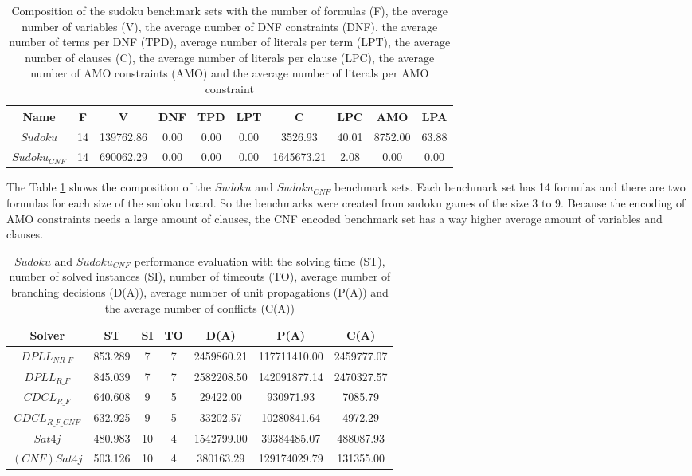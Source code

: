 \begin{table}[!htb]
\centering
\caption[Composition of the sudoku benchmark sets]{Composition of the sudoku benchmark sets with the number of formulas (F), the average number of variables (V), the average number of DNF constraints (DNF), the average number of terms per DNF (TPD), average number of literals per term (LPT), the average number of clauses (C), the average number of literals per clause (LPC), the average number of AMO constraints (AMO) and the average number of literals per AMO constraint}
\label{tab:sudoku}
\begin{tabular}{|c|c|c|c|c|c|c|c|c|c|}
\hline
Name & F & V & DNF & TPD & LPT & C & LPC & AMO & LPA \\
\hline
$Sudoku$ & 14 & 139762.86 & 0.00 & 0.00 & 0.00 & 3526.93 & 40.01 & 8752.00 & 63.88 \\ 
 \hline 
$Sudoku_{CNF}$ & 14 & 690062.29 & 0.00 & 0.00 & 0.00 & 1645673.21 & 2.08 & 0.00 & 0.00 \\ 
 \hline 
\end{tabular}
\end{table}

The Table \ref{tab:sudoku} shows the composition of the $Sudoku$ and $Sudoku_{CNF}$ benchmark sets. Each benchmark set has 14 formulas and there are two formulas for each size of the sudoku board. So the benchmarks were created from sudoku games of the size 3 to 9. Because the encoding of AMO constraints needs a large amount of clauses, the CNF encoded benchmark set has a way higher average amount of variables and clauses.

\begin{table}[!htb]
\centering
\caption[$Sudoku$ and $Sudoku_{CNF}$ performance evaluation]{$Sudoku$ and $Sudoku_{CNF}$ performance evaluation with the solving time (ST), number of solved instances (SI), number of timeouts (TO), average number of branching decisions (D(A)), average number of unit propagations (P(A)) and the average number of conflicts (C(A))}
\label{tab:sudokuSat}
\begin{tabular}{|c|c|c|c|c|c|c|}
\hline
Solver & ST & SI & TO & D(A) & P(A) & C(A)\\ 
\hline
$DPLL_{NR\_F}$ & 853.289 & 7 & 7 & 2459860.21 & 117711410.00 & 2459777.07 \\ 
\hline
$DPLL_{R\_F}$ & 845.039 & 7 & 7 & 2582208.50 & 142091877.14 & 2470327.57 \\ 
\hline
$CDCL_{R\_F}$ & 640.608 & 9 & 5 & 29422.00 & 930971.93 & 7085.79 \\ 
\hline
$CDCL_{R\_F\_CNF}$ & 632.925 & 9 & 5 & 33202.57 & 10280841.64 & 4972.29 \\ 
\hline
$Sat4j$ & 480.983 & 10 & 4 & 1542799.00 & 39384485.07 & 488087.93 \\
\hline
$(CNF)Sat4j$ & 503.126 & 10 & 4 & 380163.29 & 129174029.79 & 131355.00 \\ 
\hline
\end{tabular}
\end{table}


